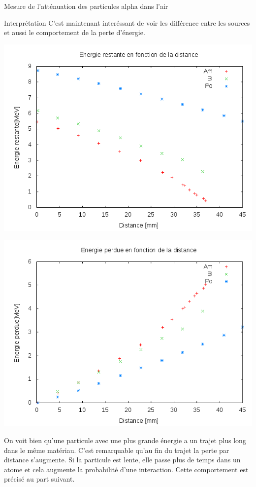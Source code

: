 \documentclass[a4paper,11pt]{scrartcl}
\begin{document}
\begin{section}{Mesure de l'atténuation des particules alpha dans l'air}
  \begin{subsection}{Interprétation}
   C'est maintenant interéssant de voir les différence entre les sources et aussi le comportement de la perte d'énergie.\\
   \begin{minipage}{0.45\textwidth}
    \includegraphics[width=\textwidth]{Sabine/alle.png}
   \end{minipage}
   \hfill
   \begin{minipage}{0.45\textwidth}
    \includegraphics[width=\textwidth]{Sabine/alle_perte.png}
   \end{minipage}
   On voit bien qu'une particule avec une plus grande énergie a un trajet plus long dans le même matériau. C'est remarquable qu'au fin du trajet la perte par distance s'augmente. Si la particule est lente, elle passe plus de temps dans un atome et cela augmente la probabilité d'une interaction. Cette comportement est précisé au part suivant. 
  \end{subsection}
 \end{section}
\end{document}

